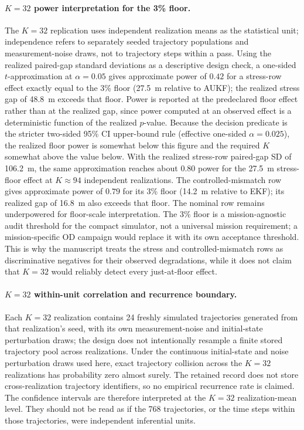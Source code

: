 \documentclass{article}
\begin{document}
\paragraph{$K=32$ power interpretation for the 3\% floor.}
The $K=32$ replication uses independent realization means as the statistical unit; independence refers to separately seeded trajectory populations and measurement-noise draws, not to trajectory steps within a pass. Using the realized paired-gap standard deviations as a descriptive design check, a one-sided $t$-approximation at $\alpha=0.05$ gives approximate power of $0.42$ for a stress-row effect exactly equal to the 3\% floor (27.5~m relative to AUKF); the realized stress gap of 48.8~m exceeds that floor. Power is reported at the predeclared floor effect rather than at the realized gap, since power computed at an observed effect is a deterministic function of the realized $p$-value. Because the decision predicate is the stricter two-sided 95\% CI upper-bound rule (effective one-sided $\alpha=0.025$), the realized floor power is somewhat below this figure and the required $K$ somewhat above the value below. With the realized stress-row paired-gap SD of 106.2~m, the same approximation reaches about 0.80 power for the 27.5~m stress-floor effect at $K\approx94$ independent realizations. The controlled-mismatch row gives approximate power of $0.79$ for its 3\% floor (14.2~m relative to EKF); its realized gap of 16.8~m also exceeds that floor. The nominal row remains underpowered for floor-scale interpretation. The 3\% floor is a mission-agnostic audit threshold for the compact simulator, not a universal mission requirement; a mission-specific OD campaign would replace it with its own acceptance threshold. This is why the manuscript treats the stress and controlled-mismatch rows as discriminative negatives for their observed degradations, while it does not claim that $K=32$ would reliably detect every just-at-floor effect.

\paragraph{$K=32$ within-unit correlation and recurrence boundary.}
Each $K=32$ realization contains 24 freshly simulated trajectories generated from that realization's seed, with its own measurement-noise and initial-state perturbation draws; the design does not intentionally resample a finite stored trajectory pool across realizations. Under the continuous initial-state and noise perturbation draws used here, exact trajectory collision across the $K=32$ realizations has probability zero almost surely. The retained record does not store cross-realization trajectory identifiers, so no empirical recurrence rate is claimed. The confidence intervals are therefore interpreted at the $K=32$ realization-mean level. They should not be read as if the 768 trajectories, or the time steps within those trajectories, were independent inferential units.
\end{document}
